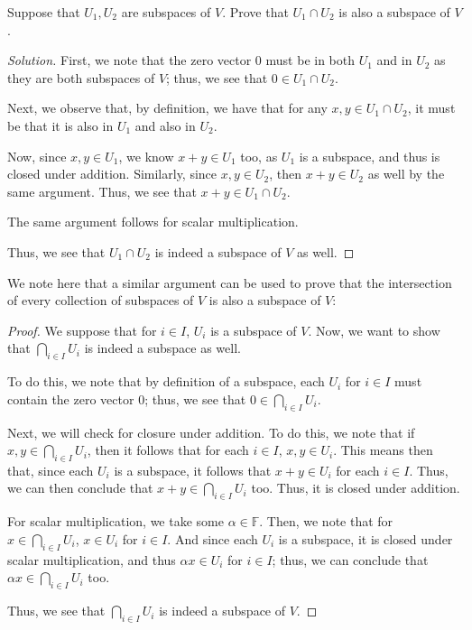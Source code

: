 \documentclass[openany]{book}
\newenvironment{solution}{\begin{proof}[Solution]}{\end{proof}}
\begin{document}
	\begin{hw}
		Suppose that $U_{1}, U_{2}$ are subspaces of $V$. Prove that $U_{1} \cap U_{2}$ is also a subspace of $V$.
	\end{hw}
	\begin{solution}
		First, we note that the zero vector $0$ must be in both $U_{1}$ and in $U_{2}$ as they are both subspaces of $V$; thus, we see that $0 \in U_{1} \cap U_{2}$.
		
		Next, we observe that, by definition, we have that for any $x,y \in U_{1} \cap U_{2}$, it must be that it is also in $U_{1}$ and also in $U_{2}$. 
		
		Now, since $x,y \in U_{1}$, we know $x + y \in U_{1}$ too, as $U_{1}$ is a subspace, and thus is closed under addition. Similarly, since $x,y \in U_{2}$, then $x + y \in U_{2}$ as well by the same argument. Thus, we see that $x + y \in U_{1} \cap U_{2}$.
		
		The same argument follows for scalar multiplication.
		
		Thus, we see that $U_{1} \cap U_{2}$ is indeed a subspace of $V$ as well.
	\end{solution}

	\begin{rmk}
		We note here that a similar argument can be used to prove that the intersection of every collection of subspaces of $V$ is also a subspace of $V$:
		\begin{proof}
			We suppose that for $i \in I$, $U_{i}$ is a subspace of $V$. Now, we want to show that $\bigcap_{i \in I} U_{i}$ is indeed a subspace as well.
			
			To do this, we note that by definition of a subspace, each $U_{i}$ for $i \in I$ must contain the zero vector $0$; thus, we see that $0 \in \bigcap_{i \in I} U_{i}$.
			
			Next, we will check for closure under addition. To do this, we note that if $x, y \in \bigcap_{i \in I} U_{i}$, then it follows that for each $i \in I$, $x, y \in U_{i}$. This means then that, since each $U_{i}$ is a subspace, it follows that $x + y \in U_{i}$ for each $i \in I$. Thus, we can then conclude that $x + y \in \bigcap_{i \in I} U_{i}$ too. Thus, it is closed under addition.
			
			For scalar multiplication, we take some $\alpha \in \mathbb{F}$. Then, we note that for $x \in \bigcap_{i \in I} U_{i}$, $x \in U_{i}$ for $i \in I$. And since each $U_{i}$ is a subspace, it is closed under scalar multiplication, and thus $\alpha x \in U_{i}$ for $i \in I$; thus, we can conclude that $\alpha x \in \bigcap_{i \in I} U_{i}$ too.
			
			Thus, we see that $\bigcap_{i \in I} U_{i}$ is indeed a subspace of $V$.
		\end{proof}
	\end{rmk}
\end{document}
